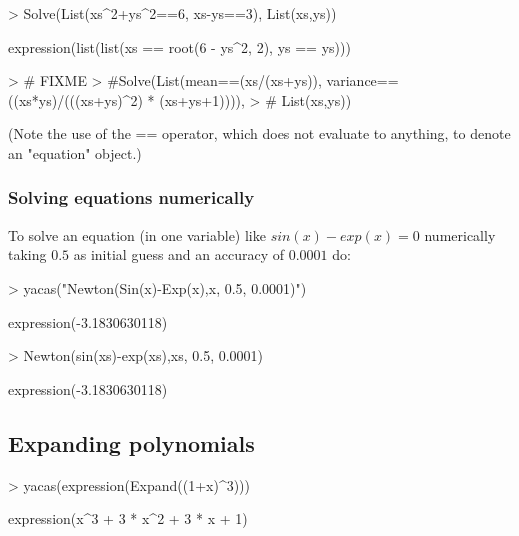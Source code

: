\documentclass[]{article}
\begin{document}
\begin{Schunk}
\begin{Sinput}
> Solve(List(xs^2+ys^2==6, xs-ys==3), List(xs,ys))
\end{Sinput}
\begin{Soutput}
expression(list(list(xs == root(6 - ys^2, 2), ys == ys)))
\end{Soutput}
\end{Schunk}

\begin{Schunk}
\begin{Sinput}
> # FIXME
> #Solve(List(mean==(xs/(xs+ys)), variance==((xs*ys)/(((xs+ys)^2) * (xs+ys+1)))),
> #    List(xs,ys))
\end{Sinput}
\end{Schunk}

(Note the use of the == operator, which does not evaluate to anything,
to denote an "equation" object.) 

\subsubsection{Solving equations numerically}
To solve an equation (in one variable) like $sin(x)-exp(x)=0$ numerically taking $0.5$
as initial guess and an accuracy of $0.0001$ do:
\begin{Schunk}
\begin{Sinput}
> yacas("Newton(Sin(x)-Exp(x),x, 0.5, 0.0001)")
\end{Sinput}
\begin{Soutput}
expression(-3.1830630118)
\end{Soutput}
\end{Schunk}

\begin{Schunk}
\begin{Sinput}
> Newton(sin(xs)-exp(xs),xs, 0.5, 0.0001) 
\end{Sinput}
\begin{Soutput}
expression(-3.1830630118)
\end{Soutput}
\end{Schunk}

\subsection{Expanding polynomials} 
\begin{Schunk}
\begin{Sinput}
> yacas(expression(Expand((1+x)^3)))
\end{Sinput}
\begin{Soutput}
expression(x^3 + 3 * x^2 + 3 * x + 1)
\end{Soutput}
\end{Schunk}
\end{document}
